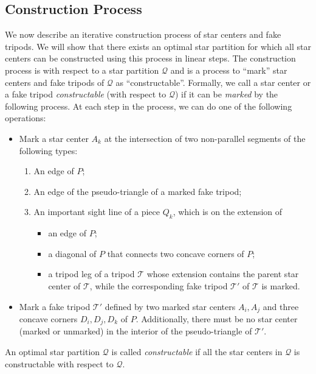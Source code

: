 \documentclass[10pt,a4paper]{article}
\begin{document}
\subsection{Construction Process}\label{sec:constproc}
We now describe an iterative construction process of star centers and fake tripods. 
We will show that there exists an optimal star partition for which all star centers can be constructed using this process in linear steps. 
The construction process is with respect to a star partition $\mathcal{Q}$ and is a process to ``mark'' star centers and fake tripods of $\mathcal{Q}$ as ``constructable''. 
Formally, we call a star center or a fake tripod \emph{constructable} (with respect to $\mathcal{Q}$) if it can be \emph{marked} by the following process. 
At each step in the process, we can do one of the following operations:
\begin{itemize}
    \item Mark a star center $A_k$ at the intersection of two non-parallel segments of the following types:
    \begin{enumerate}
        \item An edge of $P$; 
        \item An edge of the pseudo-triangle of a marked fake tripod; 
        \item An important sight line of a piece $Q_k$, which is on the extension of 
        \begin{itemize}
            \item an edge of $P$; 
            \item a diagonal of $P$ that connects two concave corners of $P$; 
            \item a tripod leg of a tripod $\mathcal{T}$ whose extension contains the parent star center of $\mathcal{T}$, while the corresponding fake tripod $\mathcal{T}'$ of $\mathcal{T}$ is marked. 
        \end{itemize}
    \end{enumerate}
    \item Mark a fake tripod $\mathcal{T}'$ defined by two marked star centers $A_i, A_j$ and three concave corners $D_i, D_j, D_k$ of $P$. 
    Additionally, there must be no star center (marked or unmarked) in the interior of the pseudo-triangle of $\mathcal{T}'$. 
\end{itemize}
An optimal star partition $\mathcal{Q}$ is called \emph{constructable} if all the star centers in $\mathcal{Q}$ is constructable with respect to $\mathcal{Q}$. 
\end{document}
